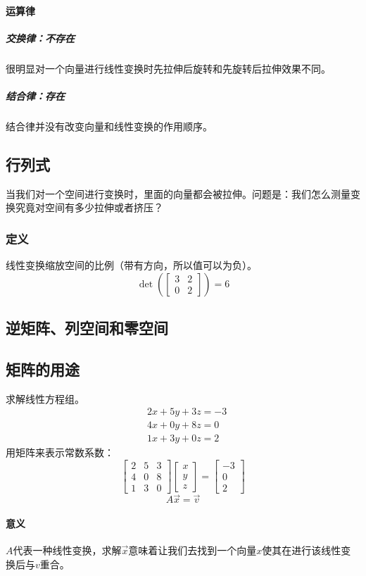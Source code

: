 \documentclass[UTF8]{ctexart}
\begin{document}
\paragraph{运算律}
\subparagraph{交换律：不存在}
很明显对一个向量进行线性变换时先拉伸后旋转和先旋转后拉伸效果不同。
\subparagraph{结合律：存在}
结合律并没有改变向量和线性变换的作用顺序。

\subsection{行列式}
当我们对一个空间进行变换时，里面的向量都会被拉伸。问题是：我们怎么测量变换究竟对空间有多少拉伸或者挤压？
\subsubsection{定义}
线性变换缩放空间的比例（带有方向，所以值可以为负）。
$$\det(\begin{bmatrix}
	3 & 2 \\ 0 & 2
\end{bmatrix}) = 6$$

\subsection{逆矩阵、列空间和零空间}
\subsection{矩阵的用途}
求解线性方程组。
\begin{align*}
	&2x+5y+3z=-3\\
	&4x+0y+8z=0\\
	&1x+3y+0z=2
\end{align*}
用矩阵来表示常数系数：
$$ \begin{bmatrix}
	2 & 5 & 3 \\
	4 & 0 & 8 \\
	1 & 3 & 0
\end{bmatrix} \begin{bmatrix}
	x \\
	y \\
	z
\end{bmatrix} = \begin{bmatrix}
	-3 \\
	0 \\
	2
\end{bmatrix}$$
$$A\overrightarrow{x} = \overrightarrow{v}$$
\paragraph{意义}
$A$代表一种线性变换，求解$\overrightarrow{x}$意味着让我们去找到一个向量$x$使其在进行该线性变换后与$v$重合。
\end{document}
